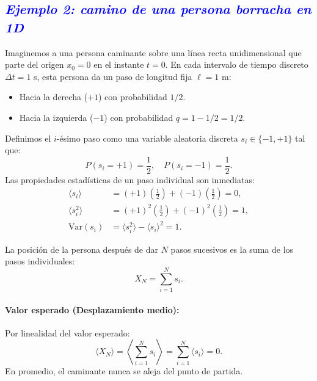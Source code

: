 \documentclass[12pt]{article}
\begin{document}
\subsection*{\textcolor{blue}{\textit{Ejemplo 2: camino de una persona borracha en 1D}}} 

Imaginemos a una persona caminante sobre una línea recta unidimensional que 
parte del origen $x_0 = 0$ en el instante $t = 0$. En cada intervalo de tiempo 
discreto $\Delta t = 1$ s, esta persona da un paso de longitud fija $\ell = 1$ m:
\begin{itemize}
    \item Hacia la derecha ($+1$) con probabilidad $1/2$.
    \item Hacia la izquierda ($-1$) con probabilidad $q = 1 - 1/2 = 1/2$.
\end{itemize}


Definimos el $i$-ésimo paso como una variable aleatoria discreta $s_i \in \{-1, +1\}$ tal que:
\begin{equation}
    P(s_i = +1) = \frac{1}{2}, \quad P(s_i = -1) = \frac{1}{2}.
\end{equation}
Las propiedades estadísticas de un paso individual son inmediatas:
\begin{align}
    \langle s_i \rangle &= (+1)\left(\frac{1}{2}\right) + (-1)\left(\frac{1}{2}\right) = 0, \\
    \langle s_i^2 \rangle &= (+1)^2\left(\frac{1}{2}\right) + (-1)^2\left(\frac{1}{2}\right) = 1, \\
    \text{Var}(s_i) &= \langle s_i^2 \rangle - \langle s_i \rangle^2 = 1.
\end{align}

La posición de la persona después de dar $N$ pasos sucesivos es la suma de los 
pasos individuales:
\begin{equation}
    X_N = \sum_{i=1}^N s_i.
\end{equation}

\paragraph{Valor esperado (Desplazamiento medio):}
Por linealidad del valor esperado:
\begin{equation}
    \langle X_N \rangle = \left\langle \sum_{i=1}^N s_i \right\rangle = \sum_{i=1}^N \langle s_i \rangle = 0.
\end{equation}
En promedio, el caminante nunca se aleja del punto de partida.
\end{document}
